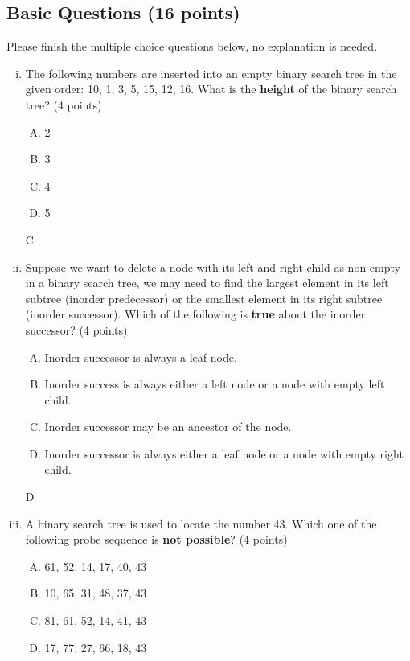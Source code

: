 \documentclass[11pt]{exam}
\begin{document}
\subsection{Basic Questions (16 points)}
Please finish the multiple choice questions below, no explanation is needed.
\begin{enumerate}[i)]
    \item The following numbers are inserted into an empty binary search tree in the given order: 10, 1, 3, 5, 15, 12, 16. What is the \textbf{height} of the binary search tree? (4 points)
    \begin{enumerate}[A.]
        \item 2
        \item 3
        \item 4
        \item 5
    \end{enumerate}
    
    \begin{solution}
    C
    \end{solution}
    
    \item Suppose we want to delete a node with its left and right child as non-empty in a binary search tree, we may need to find the largest element in its left subtree (inorder predecessor) or the smallest element in its right subtree (inorder successor). Which of the following is \textbf{true} about the inorder successor? (4 points)
    \begin{enumerate}[A.]
        \item Inorder successor is always a leaf node.
        \item Inorder success is always either a left node or a node with empty left child.
        \item Inorder successor may be an ancestor of the node.
        \item Inorder successor is always either a leaf node or a node with empty right child.
    \end{enumerate}
    
    \begin{solution}
    D
    \end{solution}
    
    \item A binary search tree is used to locate the number 43. Which one of the following probe sequence is \textbf{not possible}? (4 points)
    \begin{enumerate}[A.]
        \item 61, 52, 14, 17, 40, 43
        \item 10, 65, 31, 48, 37, 43
        \item 81, 61, 52, 14, 41, 43
        \item 17, 77, 27, 66, 18, 43
    \end{enumerate}
    

\end{enumerate}
\end{document}
